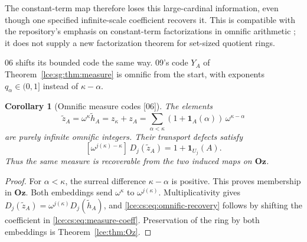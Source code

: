 \documentclass[11pt,letterpaper]{article}
\numberwithin{equation}{section}
\newtheorem{corollary}[theorem]{Corollary}
\theoremstyle{definition}
\theoremstyle{remark}
\newcommand{\Oz}{\mathbf{Oz}}
\newcommand{\coef}[2]{[\omega^{#1}]\,#2}
\newcommand{\thref}[1]{Theorem~\ref{#1}}
\newcommand{\src}[1]{\textup{\textsf{\small[#1]}}}%
\begin{document}
The constant-term map therefore loses this large-cardinal information,
even though one specified infinite-scale coefficient recovers it.
This is compatible with the repository's emphasis on constant-term
factorizations in omnific arithmetic \cite{RepoQuotients}; it does not
supply a new factorization theorem for set-sized quotient rings.

06 shifts its bounded code the same way. 09's code $Y_A$ of
\thref{lce:sg:thm:measure} is omnific from the start, with exponents
$q_\alpha\in(0,1]$ instead of $\kappa-\alpha$.

\begin{corollary}[Omnific measure codes \src{06}]\label{lce:cs:cor:omnific-code}
The elements
\begin{equation}\label{lce:cs:eq:zA}
 \tilde z_A=\omega^\kappa\tilde h_A=z_\kappa+z_A
    =\sum_{\alpha<\kappa}(1+\mathbf 1_A(\alpha))\,\omega^{\kappa-\alpha}
\end{equation}
are purely infinite omnific integers. Their transport defects satisfy
\begin{equation}\label{lce:cs:eq:omnific-recovery}
 \coef{j(\kappa)-\kappa}{D_j(\tilde z_A)}=1+\mathbf 1_{U_j}(A).
\end{equation}
Thus the same measure is recoverable from the two induced maps on $\Oz$.
\end{corollary}
\begin{proof}
For $\alpha<\kappa$, the surreal difference $\kappa-\alpha$ is positive. This
proves membership in $\Oz$. Both embeddings send $\omega^\kappa$ to
$\omega^{j(\kappa)}$. Multiplicativity gives
$D_j(\tilde z_A)=\omega^{j(\kappa)}D_j(\tilde h_A)$, and
\eqref{lce:cs:eq:omnific-recovery} follows by shifting the coefficient in
\eqref{lce:cs:eq:measure-coeff}. Preservation of the ring by both embeddings
is \thref{lce:thm:Oz}.
\end{proof}
\end{document}
